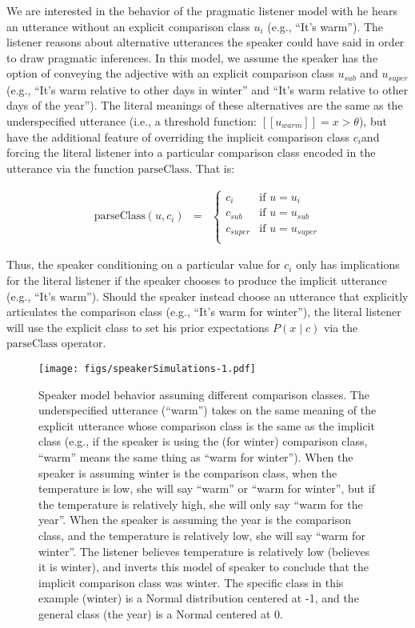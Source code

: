 \documentclass[doc]{apa6}
\begin{document}
We are interested in the behavior of the pragmatic listener model with
he hears an utterance without an explicit comparison class \(u_{i}\)
(e.g., ``It's warm''). The listener reasons about alternative
utterances the speaker could have said in order to draw pragmatic
inferences. In this model, we assume the speaker has the option of
conveying the adjective with an explicit comparison class \(u_{sub}\)
and \(u_{super}\) (e.g., ``It's warm relative to other days in
winter'' and ``It's warm relative to other days of the year'').
The literal meanings of these alternatives are the same as the
underspecified utterance (i.e., a threshold function:
\([\![u_{warm}]\!] = x > \theta\)), but have the additional feature of
overriding the implicit comparison class \(c_i\)and forcing the literal
listener into a particular comparison class encoded in the utterance via
the function \(\text{parseClass}\). That is:

\begin{eqnarray}
\text{parseClass}(u, c_i) & = &
\begin{cases}
c_{i} & \text{if } u = u_{i}\\
c_{sub} & \text{if } u = u_{sub}\\
c_{super} & \text{if } u = u_{super}\\
\end{cases}
\end{eqnarray}

Thus, the speaker conditioning on a particular value for \(c_{i}\) only
has implications for the literal listener if the speaker chooses to
produce the implicit utterance (e.g., ``It's warm''). Should the
speaker instead choose an utterance that explicitly articulates the
comparison class (e.g., ``It's warm for winter''), the literal
listener will use the explicit class to set his prior expectations
\(P(x \mid c)\) via the \(\text{parseClass}\) operator.

\begin{figure}
\centering
\texttt{[image: figs/speakerSimulations-1.pdf]}
\caption{\label{fig:speakerSimulations}Speaker model behavior assuming
different comparison classes. The underspecified utterance
(``warm'') takes on the same meaning of the explicit utterance
whose comparison class is the same as the implicit class (e.g., if the
speaker is using the (for winter) comparison class, ``warm'' means
the same thing as ``warm for winter''). When the speaker is
assuming winter is the comparison class, when the temperature is low, she
will say ``warm'' or ``warm for winter'', but if the
temperature is relatively high, she will only say ``warm for the
year''. When the speaker is assuming the year is the comparison class,
and the temperature is relatively low, she will say ``warm for
winter''. The listener believes temperature is relatively low (believes
it is winter), and inverts this model of speaker to conclude that the
implicit comparison class was winter. The specific class in this example
(winter) is a Normal distribution centered at -1, and the general class
(the year) is a Normal centered at 0.}
\end{figure}
\end{document}
